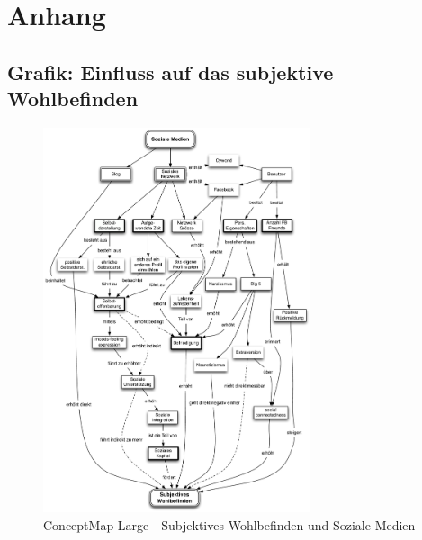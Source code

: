 %
%


\appendix
\chapter{Anhang}\label{chap.anhang}

\section{Grafik: Einfluss auf das subjektive Wohlbefinden}\label{sec.anhangGrafik}
\begin{figure}[H]
	\centering
		\includegraphics[width=0.7\textwidth]{images/grafiken/conceptMap_Swb_Sm_v2.pdf}
	\caption{ConceptMap Large - Subjektives Wohlbefinden und Soziale Medien}
	\label{fig.ConceptMapSwbSmAnhang}
\end{figure}
